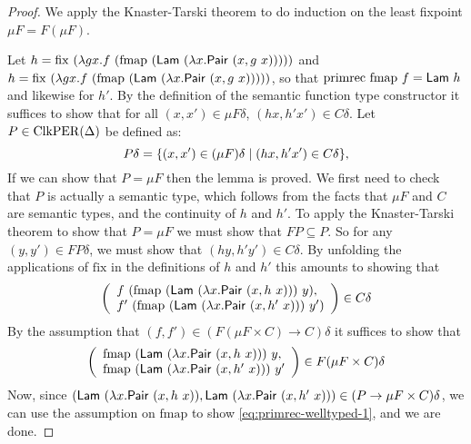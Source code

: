 \begin{proof}
  We apply the Knaster-Tarski theorem to do induction on the least
  fixpoint $\mu F = F(\mu F)$.

  Let $h = \mathrm{fix}\ (\lambda g x. f\ (\mathrm{fmap}\
  (\semCons{Lam}\ (\lambda x. \semCons{Pair}\ (x, g\ x)))))$ and $h =
  \mathrm{fix}\ (\lambda g x. f\ (\mathrm{fmap}\ (\mathsf{Lam}\
  (\lambda x. \mathsf{Pair}\ (x, g\ x)))))$, so that
  $\mathrm{primrec}\ \mathrm{fmap}\ f = \semCons{Lam}\ h$ and likewise
  for $h'$. By the definition of the semantic function type
  constructor it suffices to show that for all $(x,x') \in \mu F
  \delta$, $(h x, h' x') \in C\delta$. Let $P \in \mathrm{ClkPER}(\Delta)$ be
  defined as:
  \begin{displaymath}
    P\delta = \{ (x,x') \in (\mu F)\delta \mathrel| (h x, h' x') \in C\delta \},
  \end{displaymath}
  If we can show that $P = \mu F$ then the lemma is proved. We first
  need to check that $P$ is actually a semantic type, which follows
  from the facts that $\mu F$ and $C$ are semantic types, and the
  continuity of $h$ and $h'$. To apply the Knaster-Tarski theorem to
  show that $P = \mu F$ we must show that $FP \subseteq P$. So for any
  $(y,y') \in FP\delta$, we must show that $(h y, h' y') \in
  C\delta$. By unfolding the applications of $\mathrm{fix}$ in the
  definitions of $h$ and $h'$ this amounts to showing that
  \begin{displaymath}
    \left(
      \begin{array}{l}
        f\ (\mathrm{fmap}\ (\semCons{Lam}\ (\lambda x. \semCons{Pair}\ (x,h\ x)))\ y),\\
        f'\ (\mathrm{fmap}\ (\semCons{Lam}\ (\lambda x. \semCons{Pair}\ (x,h'\ x)))\ y')
      \end{array}
    \right)\in C\delta
  \end{displaymath}
  By the assumption that $(f,f') \in (F(\mu F \times C) \to C)\delta$
  it suffices to show that
  \begin{equation}
    \label{eq:primrec-welltyped-1}
    \left(
      \begin{array}{l}
        \mathrm{fmap}\ (\semCons{Lam}\ (\lambda x. \semCons{Pair}\ (x,h\ x)))\ y,\\
        \mathrm{fmap}\ (\semCons{Lam}\ (\lambda x. \semCons{Pair}\ (x,h'\ x)))\ y'
      \end{array}
    \right)\in F(\mu F \times C)\delta
  \end{equation}
  Now, since $(\semCons{Lam}\ (\lambda x. \semCons{Pair}\ (x,h\ x)),
  \semCons{Lam}\ (\lambda x. \semCons{Pair}\ (x,h'\ x))) \in (P \to
  \mu F \times C)\delta$, we can use the assumption on $\mathrm{fmap}$
  to show \autoref{eq:primrec-welltyped-1}, and we are done.
\end{proof}

